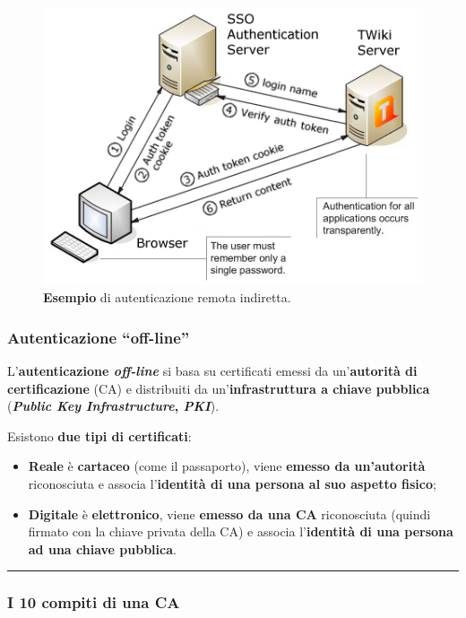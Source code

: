 \documentclass[a4paper]{article}
\newcommand{\longline}{\noindent\rule{\textwidth}{0.4pt}}
\newcommand{\dquotes}[1]{``#1''}
\begin{document}
	\noindent
	\begin{figure}[!htp]
		\centering
		\includegraphics[width=.8\textwidth]{img/int-aut_e_autor/aut-remota_indiretta.png}
		\caption{\textcolor{Green4}{\textbf{Esempio}} di autenticazione remota indiretta.}
	\end{figure}\newpage
	
	\subsubsection{Autenticazione \dquotes{off-line}}
	
	L'\textcolor{Red3}{\textbf{autenticazione \emph{off-line}}} si basa su certificati emessi da un'\textbf{autorità di certificazione} (CA) e distribuiti da un'\textbf{infrastruttura a chiave pubblica} (\textbf{\emph{Public Key Infrastructure}, \emph{PKI}}).\newline
	
	\noindent
	Esistono \textbf{due tipi di certificati}:
	\begin{itemize}
		\item \textcolor{Red3}{\textbf{Reale}} è \textbf{cartaceo} (come il passaporto), viene \textbf{emesso da un'autorità} riconosciuta e associa l'\textbf{identità di una persona al suo aspetto fisico};
		
		\item \textcolor{Red3}{\textbf{Digitale}} è \textbf{elettronico}, viene \textbf{emesso da una CA} riconosciuta (quindi firmato con la chiave privata della CA) e associa l'\textbf{identità di una persona ad una chiave pubblica}.
	\end{itemize}
	
	\longline
	
	\subsubsection{I 10 compiti di una CA}
	
\end{document}
